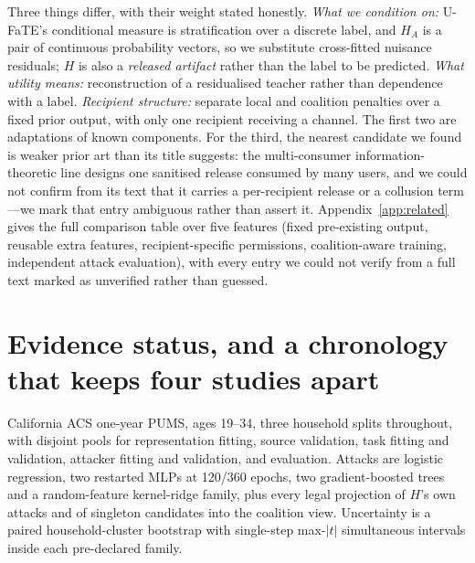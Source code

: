 \documentclass[10pt]{article}
\begin{document}
Three things differ, with their weight stated honestly. \emph{What we condition on:} U-FaTE's
conditional measure is stratification over a discrete label, and $H_A$ is a pair of continuous
probability vectors, so we substitute cross-fitted nuisance residuals; $H$ is also a \emph{released
artifact} rather than the label to be predicted. \emph{What utility means:} reconstruction of a
residualised teacher rather than dependence with a label. \emph{Recipient structure:} separate local
and coalition penalties over a fixed prior output, with only one recipient receiving a channel. The
first two are adaptations of known components. For the third, the nearest candidate we found is
weaker prior art than its title suggests: the multi-consumer information-theoretic line
\citep{sankar2013utility} designs one sanitised release consumed by many users, and we could not
confirm from its text that it carries a per-recipient release or a collusion term---we mark that
entry ambiguous rather than assert it. Appendix~\ref{app:related} gives the full comparison table over
five features (fixed pre-existing output, reusable extra features, recipient-specific permissions,
coalition-aware training, independent attack evaluation), with every entry we could not verify from a
full text marked as unverified rather than guessed.

\section{Evidence status, and a chronology that keeps four studies apart}
\label{sec:design}

California ACS one-year PUMS, ages 19--34, three household splits throughout, with disjoint pools for
representation fitting, source validation, task fitting and validation, attacker fitting and
validation, and evaluation. Attacks are logistic regression, two restarted MLPs at 120/360 epochs,
two gradient-boosted trees and a random-feature kernel-ridge family, plus every legal projection of
$H$'s own attacks and of singleton candidates into the coalition view. Uncertainty is a paired
household-cluster bootstrap with single-step max-$|t|$ simultaneous intervals inside each pre-declared
family.

\begin{table}[t]
\centering\footnotesize

\caption{Four studies, kept apart by what each is evidence \emph{for}. Only Study~1 is confirmatory.
Study~3 is a \emph{new formulation designed to repair a defect Study~2 diagnosed after evaluation};
it does not retroactively repair Study~2's evaluated maps, and its 2017 pass is development on a
partition Study~1 already spent, not a second sealed-year confirmation.
\noteStudyChronology}
\label{tab:chronology}
\end{table}
\end{document}
